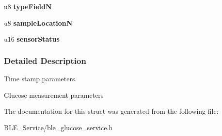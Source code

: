 \begin{DoxyCompactItemize}
\item 
u8 {\bfseries type\+FieldN}\hypertarget{struct_b_l_e___g_l_u_c_o_s_e___measurement_a2cf2d35aa2a13906f9a540ffd0def9f4}{}\label{struct_b_l_e___g_l_u_c_o_s_e___measurement_a2cf2d35aa2a13906f9a540ffd0def9f4}

\item 
u8 {\bfseries sample\+LocationN}\hypertarget{struct_b_l_e___g_l_u_c_o_s_e___measurement_a9fc72a8438ad43b5c935678af4333012}{}\label{struct_b_l_e___g_l_u_c_o_s_e___measurement_a9fc72a8438ad43b5c935678af4333012}

\item 
u16 {\bfseries sensor\+Status}\hypertarget{struct_b_l_e___g_l_u_c_o_s_e___measurement_a5cbf4f0fe79a89206d8077cfb43760f2}{}\label{struct_b_l_e___g_l_u_c_o_s_e___measurement_a5cbf4f0fe79a89206d8077cfb43760f2}

\end{DoxyCompactItemize}


\subsubsection{Detailed Description}
Time stamp parameters. 

Glucose measurement parameters 

The documentation for this struct was generated from the following file\+:\begin{DoxyCompactItemize}
\item 
B\+L\+E\+\_\+\+Service/ble\+\_\+glucose\+\_\+service.\+h\end{DoxyCompactItemize}
